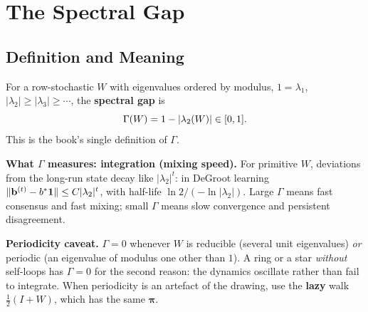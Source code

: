 \documentclass[../structural_economics_book.tex]{subfiles}
\begin{document}
\section{The Spectral Gap}
\label{ch06:sec:gap}

\subsection{Definition and Meaning}

\begin{definition}\label{ch06:def:gap}
For a row-stochastic $W$ with eigenvalues ordered by modulus, $1 = \lambda_1$, $|\lambda_2| \geq |\lambda_3| \geq \cdots$, the \textbf{spectral gap} is
\begin{equation}\label{ch06:eq:gap}
\Gamma(W) = 1 - |\lambda_2(W)| \in [0, 1].
\end{equation}
This is the book's single definition of $\Gamma$.
\end{definition}

\textbf{What $\Gamma$ measures: integration (mixing speed).} For primitive $W$, deviations from the long-run state decay like $|\lambda_2|^t$: in DeGroot learning $\|\mathbf{b}^{(t)} - b^*\mathbf{1}\| \leq C|\lambda_2|^t$, with half-life $\ln 2 / (-\ln|\lambda_2|)$. Large $\Gamma$ means fast consensus and fast mixing; small $\Gamma$ means slow convergence and persistent disagreement.

\textbf{Periodicity caveat.} $\Gamma = 0$ whenever $W$ is reducible (several unit eigenvalues) \textit{or} periodic (an eigenvalue of modulus one other than $1$). A ring or a star \textit{without} self-loops has $\Gamma = 0$ for the second reason: the dynamics oscillate rather than fail to integrate. When periodicity is an artefact of the drawing, use the \textbf{lazy} walk $\frac12(I + W)$, which has the same $\boldsymbol{\pi}$.
\end{document}
